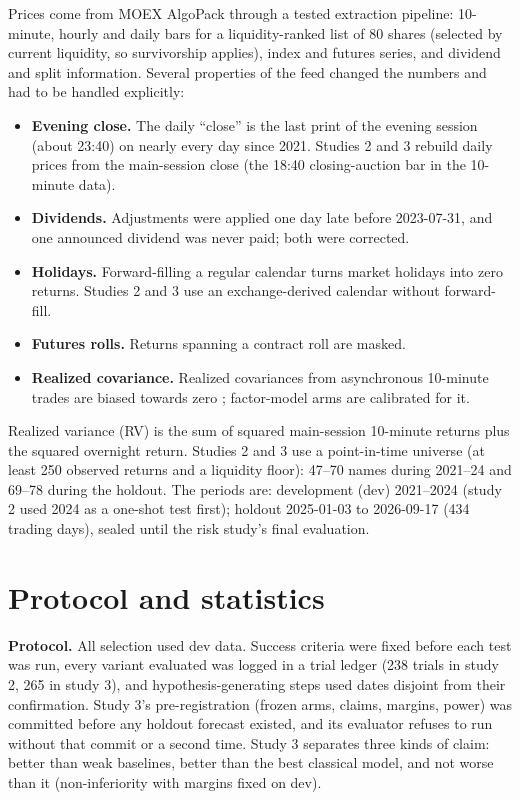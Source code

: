 \documentclass[11pt]{article}
\begin{document}
Prices come from MOEX AlgoPack through a tested extraction pipeline: 10-minute, hourly and daily bars for a
liquidity-ranked list of 80 shares (selected by current liquidity, so survivorship applies), index and futures series, and
dividend and split information. Several properties of the feed changed the numbers and had to be handled
explicitly:
\begin{itemize}
  \item \textbf{Evening close.} The daily ``close'' is the last print of the evening session (about 23:40) on
    nearly every day since 2021. Studies 2 and 3 rebuild daily prices from the main-session close (the
    18:40 closing-auction bar in the 10-minute data).
  \item \textbf{Dividends.} Adjustments were applied one day late before 2023-07-31, and one announced dividend
    was never paid; both were corrected.
  \item \textbf{Holidays.} Forward-filling a regular calendar turns market holidays into zero returns. Studies 2
    and 3 use an exchange-derived calendar without forward-fill.
  \item \textbf{Futures rolls.} Returns spanning a contract roll are masked.
  \item \textbf{Realized covariance.} Realized covariances from asynchronous 10-minute trades are biased towards
    zero \citep{epps1979comovements}; factor-model arms are calibrated for it.
\end{itemize}
Realized variance (RV) is the sum of squared main-session 10-minute returns plus the squared overnight return.
Studies 2 and 3 use a point-in-time universe (at least 250 observed returns and a liquidity floor): 47--70
names during 2021--24 and 69--78 during the holdout. The periods are: development (dev) 2021--2024 (study 2
used 2024 as a one-shot test first); holdout 2025-01-03 to 2026-09-17 (434 trading days), sealed until the risk
study's final evaluation.

\section{Protocol and statistics}\label{sec:protocol}

\textbf{Protocol.} All selection used dev data. Success criteria were fixed before each test was run, every
variant evaluated was logged in a trial ledger (238 trials in study 2, 265 in study 3), and hypothesis-generating
steps used dates disjoint from their confirmation. Study 3's pre-registration (frozen arms, claims, margins,
power) was committed before any holdout forecast existed, and its evaluator refuses to run without that commit
or a second time. Study 3 separates three kinds of claim: better than weak baselines, better than the best
classical model, and not worse than it (non-inferiority with margins fixed on dev).
\end{document}
